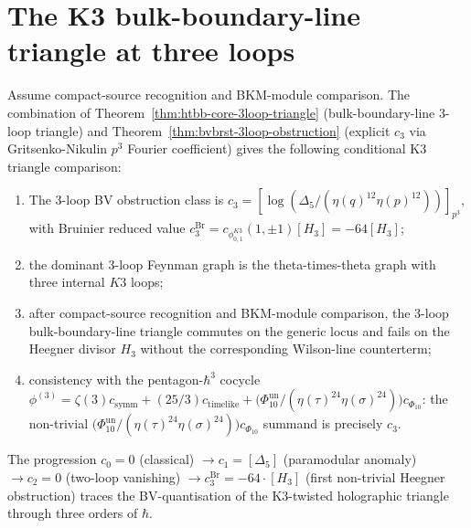 \section{The K3 bulk-boundary-line triangle
at three loops}
\label{sec:htbb-core-supplement-ii}

\begin{remark}
\label{rem:htbb-core-synthesis}

Assume compact-source recognition and BKM-module comparison. The
combination of
Theorem~\ref{thm:htbb-core-3loop-triangle} (bulk-boundary-line
$3$-loop triangle) and
Theorem~\ref{thm:bvbrst-3loop-obstruction} (explicit $c_3$ via
Gritsenko-Nikulin $p^3$ Fourier coefficient) gives the following
conditional K3 triangle comparison:
\begin{enumerate}[leftmargin=1.8em]
\item The $3$-loop BV obstruction class is
	 $c_3 = [\log(\Delta_5/(\eta(q)^{12}\eta(p)^{12}))]_{p^3}$, with
	 Bruinier reduced value
	 \(c^{\mathrm{Br}}_3=c_{\phi_{0,1}^{K3}}(1,\pm1)[H_3]=-64[H_3]\);
\item the dominant $3$-loop Feynman graph is the theta-times-theta
 graph with three internal $K3$ loops;
\item after compact-source recognition and BKM-module comparison, the
 $3$-loop bulk-boundary-line triangle commutes on the generic locus and
 fails on the Heegner divisor $H_3$ without the corresponding
 Wilson-line counterterm;
\item consistency with the pentagon-$\hbar^3$ cocycle
	 $\phi^{(3)} = \zeta(3) c_{\mathrm{symm}} + (25/3) c_{\mathrm{timelike}}
	 + \bigl(\Phi_{10}^{\mathrm{un}}/(\eta(\tau)^{24}\eta(\sigma)^{24})\bigr)c_{\Phi_{10}}$: the non-trivial
	 \(\bigl(\Phi_{10}^{\mathrm{un}}/(\eta(\tau)^{24}\eta(\sigma)^{24})\bigr)c_{\Phi_{10}}\) summand is precisely $c_3$.
\end{enumerate}
The progression $c_0 = 0$ (classical) $\to c_1 = [\Delta_5]$
(paramodular anomaly) $\to c_2 = 0$ (two-loop vanishing)
	$\to c^{\mathrm{Br}}_3 = -64\cdot[H_3]$ (first non-trivial Heegner
obstruction) traces the
BV-quantisation of the K3-twisted holographic triangle through
three orders of $\hbar$.
\end{remark}

